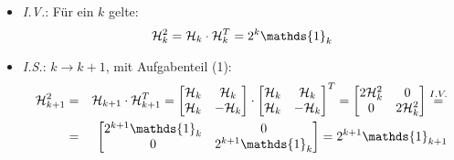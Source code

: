 \begin{flushenum}
\begin{itemize}
			\item \textit{I.V.}: Für ein $k$ gelte:
				\[ \H_k^2 = \H_k \cdot \H_k^T = 2^k \mathds{1}_k \]

			\item \textit{I.S.}: $k \rightarrow k + 1$, mit Aufgabenteil (1):
				\begin{eqnarray*}
					\H_{k+1}^2 &=& \H_{k+1} \cdot \H_{k+1}^T = \begin{bmatrix}
						\H_k & \H_k \\
						\H_k & -\H_k \\
					\end{bmatrix} \cdot \begin{bmatrix}
						\H_k & \H_k \\
						\H_k & -\H_k \\
					\end{bmatrix}^T =
					\begin{bmatrix}
						2 \H_k^2 & 0 \\
						0 & 2 \H_k^2
					\end{bmatrix} \overset{I.V.}{=} \\
					&=&
					\begin{bmatrix}
						2^{k+1} \mathds{1}_k & 0 \\
						0 & 2^{k+1}\mathds{1}_k \\
					\end{bmatrix} = 
					2^{k+1} \mathds{1}_{k+1}
				\end{eqnarray*}
		\end{itemize}
\end{flushenum}
